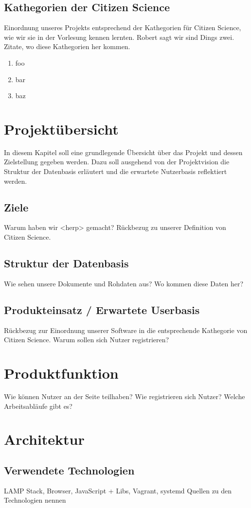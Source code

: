 \documentclass{article}
\begin{document}
\subsection{Kathegorien der Citizen Science}
Einordnung unseres Projekts entsprechend der Kathegorien für Citizen Science,
wie wir sie in der Vorlesung kennen lernten.
Robert sagt wir sind Dings zwei.
Zitate, wo diese Kathegorien her kommen.
\begin{enumerate}
\item foo
\item bar
\item baz
\end{enumerate}
\section{Projektübersicht}
In diesem Kapitel soll eine grundlegende Übersicht über das Projekt und dessen Zielstellung gegeben werden. Dazu soll ausgehend von der Projektvision die Struktur der Datenbasis erläutert und die erwartete Nutzerbasis reflektiert werden.
\subsection{Ziele}
Warum haben wir <herp> gemacht?
Rückbezug zu unserer Definition von Citizen Science.
\subsection{Struktur der Datenbasis}
Wie sehen unsere Dokumente und Rohdaten aus?
Wo kommen diese Daten her?
\subsection{Produkteinsatz / Erwartete Userbasis}
Rückbezug zur Einordnung unserer Software in die entsprechende Kathegorie von Citizen Science.
Warum sollen sich Nutzer registrieren?
\section{Produktfunktion}
Wie können Nutzer an der Seite teilhaben?
Wie registrieren sich Nutzer?
Welche Arbeitsabläufe gibt es?
\section{Architektur}
\subsection{Verwendete Technologien}
LAMP Stack, Browser, JavaScript + Libs, Vagrant, systemd 
Quellen zu den Technologien nennen
\end{document}
